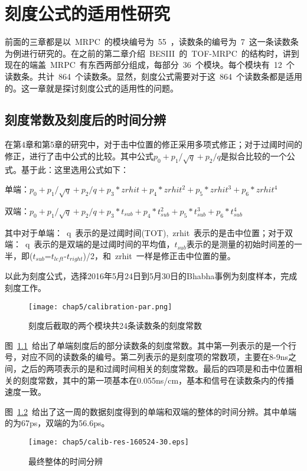 \chapter{刻度公式的适用性研究}
前面的三章都是以~MRPC~的模块编号为~55~，读数条的编号为~7~这一条读数条为例进行研究的。在之前的第二章介绍~BESIII~的~TOF-MRPC~的结构时，讲到现在的端盖~MRPC~有东西两部分组成，每部分~36~个模块。每个模块有~12~个读数条。共计~864~个读数条。显然，刻度公式需要对于这~864~个读数条都是适用的。这一章就是探讨刻度公式的适用性的问题。
\section{刻度常数及刻度后的时间分辨}
在第4章和第5章的研究中，对于击中位置的修正采用多项式修正；对于过阈时间的修正，进行了击中公式的比较。其中公式${p_{0}+p_{1}/\sqrt{q}+p_{2}/q}$是拟合比较的一个公式。基于此：这里选用公式如下：

单端：$p_{0}+p_{1}/\sqrt{q}+p_{2}/q+p_{3}*zrhit+p_{4}*zrhit^{2}+p_{5}*zrhit^{3}+p_{6}*zrhit^{4}$

双端：$p_{0}+p_{1}/\sqrt{q}+p_{2}/q+p_{3}*t_{sub}+p_{4}*t_{sub}^{2}+p_{5}*t_{sub}^{3}+p_{6}*t_{sub}^{4}$

其中对于单端：~q~表示的是过阈时间(TOT),~zrhit~表示的是击中位置；对于双端：~q~表示的是双端的是过阈时间的平均值，$t_{sub}$表示的是测量的初始时间差的一半，即($t_{sub}$=$t_{left}$-$t_{right}$)/2，和~zrhit~一样是修正击中位置的量。


以此为刻度公式，选择2016年5月24日到5月30日的Bhabha事例为刻度样本，完成刻度工作。

\begin{figure}[!h]
\centering
\texttt{[image: chap5/calibration-par.png]}
\caption{刻度后截取的两个模块共24条读数条的刻度常数}
\label{fig:calibration-par}
\end{figure}
图~\ref{fig:calibration-par}~给出了单端刻度后的部分读数条的刻度常数。其中第一列表示的是一个行号，对应不同的读数条的编号。第二列表示的是刻度项的常数项，主要在8-9ns之间，之后的两项表示的是和过阈时间相关的刻度常数。最后的四项是和击中位置相关的刻度常数，其中的第一项基本在0.055ns/cm，基本和信号在读数条内的传播速度一致。

图~\ref{fig:calib-res-160524-30}~给出了这一周的数据刻度得到的单端和双端的整体的时间分辨。其中单端的为67ps，双端的为56.6ps。
\begin{figure}[!h]
\centering
\texttt{[image: chap5/calib-res-160524-30.eps]}
\caption{最终整体的时间分辨}
\label{fig:calib-res-160524-30}
\end{figure}

